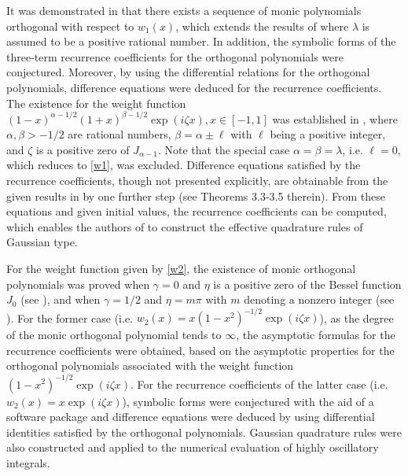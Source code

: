 \documentclass[11pt,a4paper]{article}
\numberwithin{equation}{section}
\begin{document}
It was demonstrated in \cite[Theorem 2.2]{MCM} that there exists a sequence of monic polynomials orthogonal with respect to $w_1(x)$, which extends the results of \cite{MCS} where $\lambda$ is assumed to be a positive rational number. In addition, the symbolic forms of the three-term recurrence coefficients for the orthogonal polynomials were conjectured. Moreover, by using the differential relations for the orthogonal polynomials, difference equations were deduced for the recurrence coefficients. The existence for the weight function $(1-x)^{\alpha-1/2}(1+x)^{\beta-1/2}\exp(i\zeta x),x\in[-1,1]$ was established in \cite{SC}, where $\alpha,\beta>-1/2$ are rational numbers, $\beta=\alpha\pm \ell$ with $\ell$ being a positive integer, and $\zeta$ is a positive zero of $J_{\alpha-1}$. Note that the special case $\alpha=\beta=\lambda$, i.e. $\ell=0$, which reduces to \eqref{w1}, was excluded. Difference equations satisfied by the recurrence coefficients, though not presented explicitly, are obtainable from the given results in \cite{SC} by one further step (see Theorems 3.3-3.5 therein). From these equations and given initial values, the recurrence coefficients can be computed, which enables the authors of \cite{SC} to construct the effective quadrature rules of Gaussian type.

For the weight function given by \eqref{w2}, the existence of monic orthogonal polynomials was proved when $\gamma=0$ and $\eta$ is a positive zero of the Bessel function $J_0$ (see \cite[Theorem 4]{MC05-1}), and when $\gamma=1/2$ and $\eta=m\pi$ with $m$ denoting a nonzero integer (see \cite[Theorem 2.3]{MC05-2}). For the former case (i.e. $w_2(x)=x(1-x^2)^{-1/2}\exp(i\zeta x)$), as the degree of the monic orthogonal polynomial tends to $\infty$, the asymptotic formulas for the recurrence coefficients were obtained, based on the asymptotic properties for the orthogonal polynomials associated with the weight function $(1-x^2)^{-1/2}\exp(i\zeta x)$. For the recurrence coefficients of the latter case (i.e. $w_2(x)=x\exp(i\zeta x)$), symbolic forms were conjectured with the aid of a software package and difference equations were deduced by using differential identities satisfied by the orthogonal polynomials. Gaussian quadrature rules were also constructed and applied to the numerical evaluation of highly oscillatory integrals.
\end{document}
